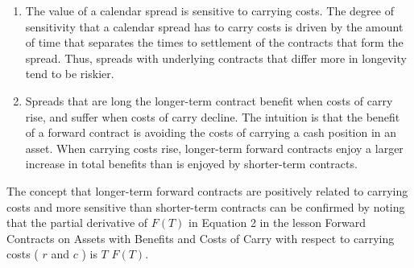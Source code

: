 \documentclass[11pt]{article}
\begin{document}
\begin{enumerate}
  \item The value of a calendar spread is sensitive to carrying costs. The degree of sensitivity that a calendar spread has to carry costs is driven by the amount of time that separates the times to settlement of the contracts that form the spread. Thus, spreads with underlying contracts that differ more in longevity tend to be riskier.

  \item Spreads that are long the longer-term contract benefit when costs of carry rise, and suffer when costs of carry decline. The intuition is that the benefit of a forward contract is avoiding the costs of carrying a cash position in an asset. When carrying costs rise, longer-term forward contracts enjoy a larger increase in total benefits than is enjoyed by shorter-term contracts.

\end{enumerate}

The concept that longer-term forward contracts are positively related to carrying costs and more sensitive than shorter-term contracts can be confirmed by noting that the partial derivative of $F(T)$ in Equation 2 in the lesson Forward Contracts on Assets with Benefits and Costs of Carry with respect to carrying costs ( $r$ and $c$ ) is $T$ $F(T)$.
\end{document}
